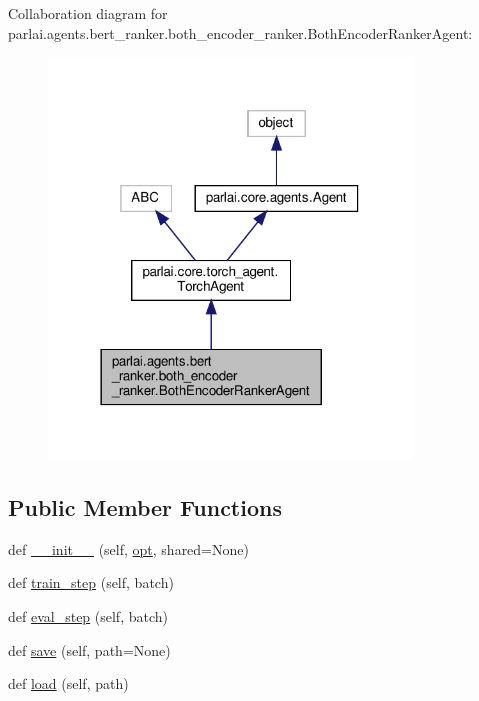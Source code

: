 Collaboration diagram for parlai.\+agents.\+bert\+\_\+ranker.\+both\+\_\+encoder\+\_\+ranker.\+Both\+Encoder\+Ranker\+Agent\+:
\nopagebreak
\begin{figure}[H]
\begin{center}
\leavevmode
\includegraphics[width=273pt]{db/d0b/classparlai_1_1agents_1_1bert__ranker_1_1both__encoder__ranker_1_1BothEncoderRankerAgent__coll__graph}
\end{center}
\end{figure}
\subsection*{Public Member Functions}
\begin{DoxyCompactItemize}
\item 
def \hyperlink{classparlai_1_1agents_1_1bert__ranker_1_1both__encoder__ranker_1_1BothEncoderRankerAgent_a96d864d610277625195f71a615c0f585}{\+\_\+\+\_\+init\+\_\+\+\_\+} (self, \hyperlink{classparlai_1_1core_1_1torch__agent_1_1TorchAgent_a785bb920cf8c8afc3e9bf6a8b77e335a}{opt}, shared=None)
\item 
def \hyperlink{classparlai_1_1agents_1_1bert__ranker_1_1both__encoder__ranker_1_1BothEncoderRankerAgent_a49ef7547db36c1570b8c10d0c8bee42e}{train\+\_\+step} (self, batch)
\item 
def \hyperlink{classparlai_1_1agents_1_1bert__ranker_1_1both__encoder__ranker_1_1BothEncoderRankerAgent_a6d189366af4a1264770d59e4b114967a}{eval\+\_\+step} (self, batch)
\item 
def \hyperlink{classparlai_1_1agents_1_1bert__ranker_1_1both__encoder__ranker_1_1BothEncoderRankerAgent_a5e8419dfd48e5a9b0a999058a9537831}{save} (self, path=None)
\item 
def \hyperlink{classparlai_1_1agents_1_1bert__ranker_1_1both__encoder__ranker_1_1BothEncoderRankerAgent_a3900966ef98a770cf6e871bb7de67907}{load} (self, path)
\end{DoxyCompactItemize}
